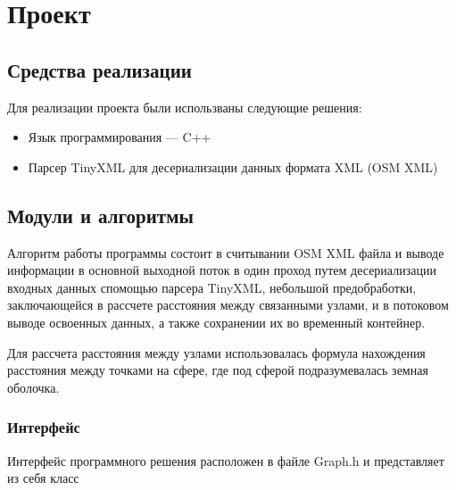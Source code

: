 \chapter{Проект}
\section{Средства реализации}
\noindent\indent Для реализации проекта были использваны следующие решения:
\begin{itemize}
  \item Язык программирования --- C++
  \item Парсер TinyXML для десериализации данных формата XML (OSM XML)
\end{itemize}

\section{Модули и алгоритмы}
\noindent\indent Алгоритм работы программы состоит в считывании OSM XML
файла и выводе информации в основной выходной поток в один проход путем
десериализации входных данных спомощью парсера TinyXML, небольшой предобработки,
заключающейся в рассчете расстояния между связанными узлами, и в потоковом выводе
освоенных данных, а также сохранении их во временный контейнер.
\par Для рассчета расстояния между узлами использовалась формула нахождения
расстояния между точками на сфере, где под сферой подразумевалась земная оболочка.
\subsection{Интерфейс}
\noindent\indent Интерфейс программного решения расположен в файле Graph.h и
представляет из себя класс 



\lstset{escapechar=@,style=customcpp}

